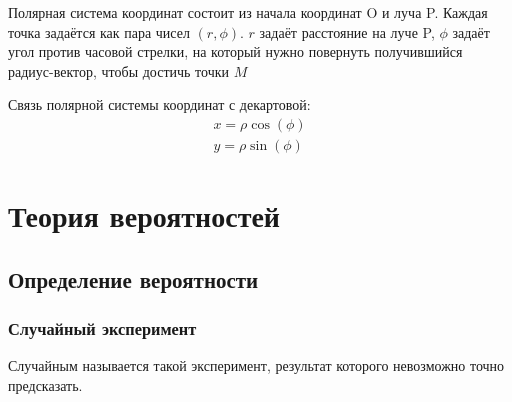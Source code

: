 \documentclass[a4paper, 12pt]{report}
\begin{document}
		Полярная система координат состоит из начала координат O и луча P. Каждая точка задаётся как пара чисел $(r, \phi)$. $r$ задаёт расстояние на луче P, $\phi$ задаёт угол против часовой стрелки, на который нужно повернуть получившийся радиус-вектор, чтобы достичь точки $M$
			
 		Связь полярной системы координат с декартовой:
 		\begin{subequations}
 			\begin{align}
 				x=\rho \cos(\phi)\\
 				y=\rho \sin(\phi)
 			\end{align}
 		\end{subequations}
\chapter{Теория вероятностей}
	\section{Определение вероятности}
		\subsection{Случайный эксперимент}
			Случайным называется такой эксперимент, результат которого невозможно точно предсказать.
			
\end{document}
